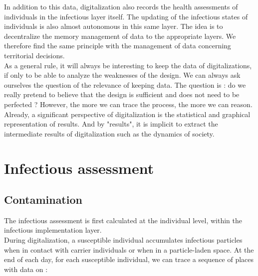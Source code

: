 In addition to this data, digitalization also records the health assessments of individuals in the infectious layer itself. The updating of the infectious states of individuals is also almost autonomous in this same layer. The idea is to decentralize the memory management of data to the appropriate layers. We therefore find the same principle with the management of data concerning territorial decisions.\\

As a general rule, it will always be interesting to keep the data of digitalizations, if only to be able to analyze the weaknesses of the design. We can always ask ourselves the question of the relevance of keeping data. The question is : do we really pretend to believe that the design is sufficient and does not need to be perfected ? However, the more we can trace the process, the more we can reason.\\

Already, a significant perspective of digitalization is the statistical and graphical representation of results. And by "results", it is implicit to extract the intermediate results of digitalization such as the dynamics of society.\\

\newpage

\section{Infectious assessment}

\subsection{Contamination}

The infectious assessment is first calculated at the individual level, within the infectious implementation layer.\\

During digitalization, a susceptible individual accumulates infectious particles when in contact with carrier individuals or when in a particle-laden space. At the end of each day, for each susceptible individual, we can trace a sequence of places with data on :\\

